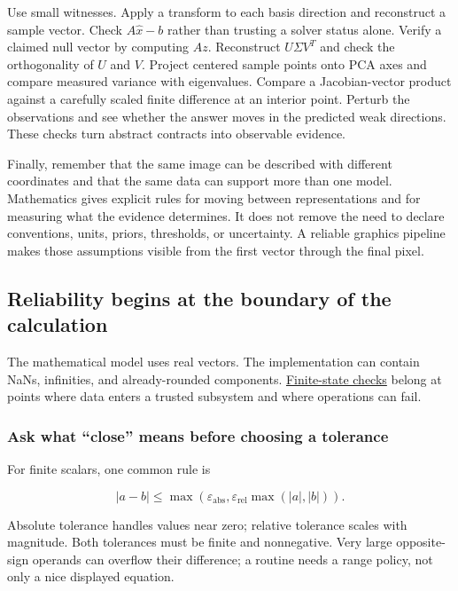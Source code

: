 Use small witnesses. Apply a transform to each basis direction and reconstruct a sample vector. Check \(A\hat x-b\) rather than trusting a solver status alone. Verify a claimed null vector by computing \(Az\). Reconstruct \(U\Sigma V^T\) and check the orthogonality of \(U\) and \(V\). Project centered sample points onto PCA axes and compare measured variance with eigenvalues. Compare a Jacobian-vector product against a carefully scaled finite difference at an interior point. Perturb the observations and see whether the answer moves in the predicted weak directions. These checks turn abstract contracts into observable evidence.

Finally, remember that the same image can be described with different coordinates and that the same data can support more than one model. Mathematics gives explicit rules for moving between representations and for measuring what the evidence determines. It does not remove the need to declare conventions, units, priors, thresholds, or uncertainty. A reliable graphics pipeline makes those assumptions visible from the first vector through the final pixel.

\subsection{Reliability begins at the boundary of the calculation}\label{02-foundations-ii-ch037-reliability-begins-at-the-boundary-of-the-calculation}

The mathematical model uses real vectors. The implementation can contain NaNs, infinities, and already-rounded components. \hyperref[02-foundations-ii-ch037-reliability-begins-at-the-boundary-of-the-calculation]{Finite-state checks} belong at points where data enters a trusted subsystem and where operations can fail.

\subsubsection{Ask what ``close'' means before choosing a tolerance}\label{02-foundations-ii-ch037-ask-what-close-means-before-choosing-a-tolerance}

For finite scalars, one common rule is

\[
|a-b|\le\max\left(\varepsilon_{\mathrm{abs}},
\varepsilon_{\mathrm{rel}}\max(|a|,|b|)\right).
\]

Absolute tolerance handles values near zero; relative tolerance scales with magnitude. Both tolerances must be finite and nonnegative. Very large opposite-sign operands can overflow their difference; a routine needs a range policy, not only a nice displayed equation.

